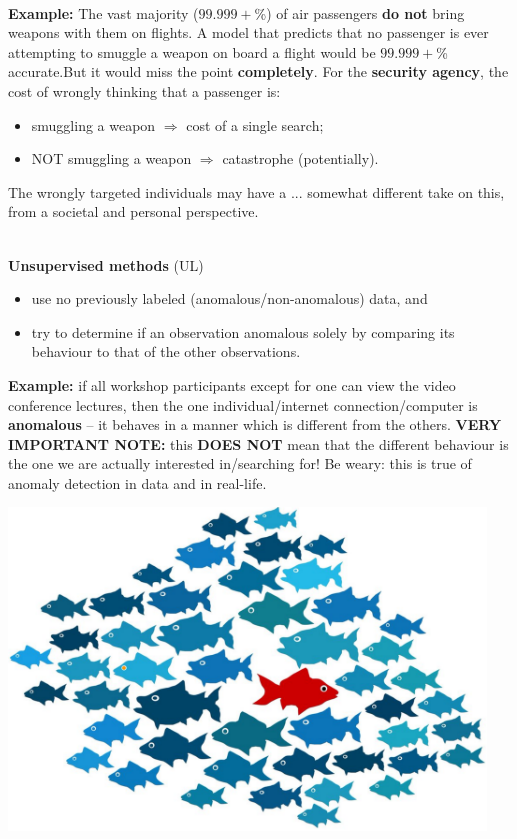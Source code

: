 \documentclass[20pt,landscape,footrule,headrule]{foils}
\newcommand{\newl}{\newline\newline}
\begin{document}
\newpage\ \\ \noindent  \textbf{Example:} The vast majority ($99.999+$\%) of air passengers \textbf{do not} bring weapons with them on flights. \newl A model that predicts that no passenger is ever attempting to smuggle a weapon on board a flight would be $99.999+$\% accurate.\newl But it would miss the point \textbf{completely}. For the \textbf{security agency}, the cost of wrongly thinking that a passenger is:
\begin{itemize}
\item  smuggling a weapon $\Longrightarrow$ cost of a single search;
\item NOT smuggling a weapon $\Longrightarrow$ catastrophe (potentially). 
\end{itemize}
\noindent The wrongly targeted individuals may have a  ... somewhat different take on this, from a societal and personal perspective.

\newpage\ \\ \noindent \textbf{Unsupervised methods} (UL) \begin{itemize}
\item use no previously labeled (anomalous/non-anomalous) data, and 
\item try to determine if an observation anomalous solely by comparing its behaviour to that of the other observations. 
\end{itemize}
\textbf{Example:} if all workshop participants except for one can view the video conference lectures, then the one individual/internet connection/computer is \textbf{anomalous} -- it behaves in a manner which is different from  the others. \newl 
\textbf{VERY IMPORTANT NOTE:} this \textbf{DOES NOT} mean that the different behaviour is the one we are actually interested in/searching for! 
\newl Be weary: this is true of anomaly detection in data and in real-life. 
\newpage
\begin{center}
\includegraphics[width=0.95\textwidth]{Images/fish.png}
\end{center}
\end{document}
